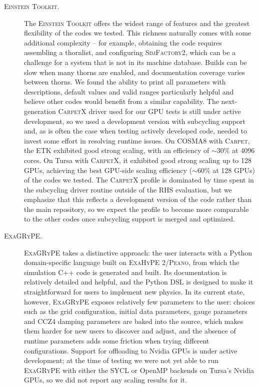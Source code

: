 \documentclass[12pt,a4paper]{article}
\numberwithin{figure}{subsection}
\newcommand{\einsteintoolkit}{\textsc{Einstein Toolkit}\xspace}
\newcommand{\etk}{\textsc{ETK}\xspace} %
\newcommand{\exagrype}{\textsc{ExaGRyPE}\xspace}
\newcommand{\carpet}{\textsc{Carpet}\xspace}
\newcommand{\carpetx}{\textsc{CarpetX}\xspace}
\newcommand{\exahype}{\textsc{ExaHyPE}\xspace}
\newcommand{\peano}{\textsc{Peano}\xspace}
\begin{document}
\begin{description}
    \item[\einsteintoolkit.] The \einsteintoolkit offers the widest range of
    features and the greatest flexibility of the codes we tested. 
    This richness naturally comes with some additional complexity -- for example, 
    obtaining the code requires assembling a thornlist, and
    configuring \textsc{SimFactory2}, which can be a challenge for a system that is not in its machine
    database. Builds can be
    slow when many thorns are enabled, and documentation coverage varies
    between thorns. We found the ability to print all parameters with
    descriptions, default values and valid ranges particularly helpful and
    believe other codes would benefit from a similar capability. The
    next-generation \carpetx driver used for our GPU tests is still under
    active development, so we used a development version with subcycling
    support and, as is often the case when testing actively developed code,
    needed to invest some effort in resolving runtime issues. On
    COSMA8 with \carpet, the \etk exhibited good strong scaling, with
    an efficiency of $\sim 30\%$ at 4096 cores. On Tursa with \carpetx,
    it exhibited good strong scaling up to 128 GPUs, achieving the best
    GPU-side scaling efficiency ($\sim 60\%$ at 128 GPUs) of the codes we
    tested. The \carpetx profile is dominated by time spent in the subcycling
    driver routine outside of the RHS evaluation, but we emphasize that this
    reflects a development version of the code rather than the main
    repository, so we expect the profile to become more comparable to the
    other codes once subcycling support is merged and optimized.

    \item[\exagrype.]
    \begin{sloppypar} %
    \exagrype takes a distinctive approach: the user
    interacts with a Python domain-specific language built on \exahype
    2/\peano, from which the simulation C++ code is generated and built. 
    Its documentation is
    relatively detailed and helpful, and the Python DSL is designed to make
    it straightforward for users to implement new physics. In its current
    state, however, \exagrype exposes relatively few parameters to the user:
    choices such as the grid configuration, initial data parameters, gauge
    parameters and CCZ4 damping parameters are baked into the source, which
    makes them harder for new users to discover and adjust, and the absence
    of runtime parameters adds some friction when trying different
    configurations. Support for offloading to Nvidia GPUs is under active
    development; at the time of testing we were not yet able to run \exagrype
    with either the SYCL or OpenMP backends on Tursa's Nvidia GPUs, so we did
    not report any scaling results for it.
    \end{sloppypar}


\end{description}
\end{document}
